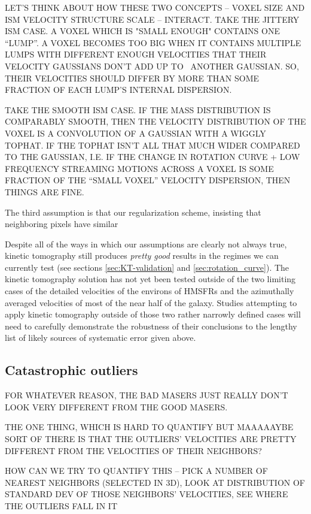 LET'S THINK ABOUT HOW THESE TWO CONCEPTS -- VOXEL SIZE AND ISM VELOCITY STRUCTURE SCALE -- INTERACT. 
TAKE THE JITTERY ISM CASE. A VOXEL WHICH IS "SMALL ENOUGH" CONTAINS ONE ``LUMP''. A VOXEL BECOMES TOO BIG WHEN IT CONTAINS MULTIPLE LUMPS WITH DIFFERENT ENOUGH VELOCITIES THAT THEIR VELOCITY GAUSSIANS DON'T ADD UP TO ~ANOTHER GAUSSIAN. SO, THEIR VELOCITIES SHOULD DIFFER BY MORE THAN SOME FRACTION OF EACH LUMP'S INTERNAL DISPERSION. 

TAKE THE SMOOTH ISM CASE. IF THE MASS DISTRIBUTION IS COMPARABLY SMOOTH, THEN THE VELOCITY DISTRIBUTION OF THE VOXEL IS A CONVOLUTION OF A GAUSSIAN WITH A WIGGLY TOPHAT. IF THE TOPHAT ISN'T ALL THAT MUCH WIDER COMPARED TO THE GAUSSIAN, I.E. IF THE CHANGE IN ROTATION CURVE + LOW FREQUENCY STREAMING MOTIONS ACROSS A VOXEL IS SOME FRACTION OF THE ``SMALL VOXEL'' VELOCITY DISPERSION, THEN THINGS ARE FINE. 


The third assumption is that our regularization scheme, insisting that neighboring pixels have similar 



Despite all of the ways in which our assumptions are clearly not always true, kinetic tomography still produces \emph{pretty good} results in the regimes we can currently test (see sections \ref{sec:KT-validation} and \ref{sec:rotation_curve}). 
The kinetic tomography solution has not yet been tested outside of the two limiting cases of the detailed velocities of the environs of HMSFRs and the azimuthally averaged velocities of most of the near half of the galaxy.
Studies attempting to apply kinetic tomography outside of those two rather narrowly defined cases will need to carefully demonstrate the robustness of their conclusions to the lengthy list of likely sources of systematic error given above.

\subsection{Catastrophic outliers}
\label{sec:discussion-catastrophic}
FOR WHATEVER REASON, THE BAD MASERS JUST REALLY DON'T LOOK VERY DIFFERENT FROM THE GOOD MASERS. 

THE ONE THING, WHICH IS HARD TO QUANTIFY BUT MAAAAAYBE SORT OF THERE IS THAT THE OUTLIERS' VELOCITIES ARE PRETTY DIFFERENT FROM THE VELOCITIES OF THEIR NEIGHBORS? 

HOW CAN WE TRY TO QUANTIFY THIS -- PICK A NUMBER OF NEAREST NEIGHBORS (SELECTED IN 3D), LOOK AT DISTRIBUTION OF STANDARD DEV OF THOSE NEIGHBORS' VELOCITIES, SEE WHERE THE OUTLIERS FALL IN IT

